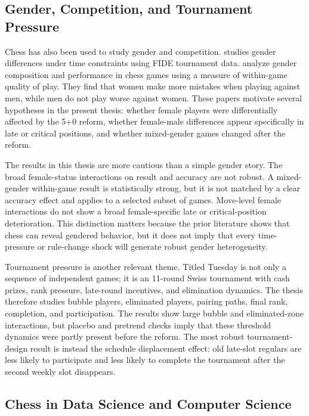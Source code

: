 \subsection{Gender, Competition, and Tournament Pressure}

Chess has also been used to study gender and competition. \citet{dilmaghani2020gender} studies gender differences under time constraints using FIDE tournament data. \citet{backus2023gender} analyze gender composition and performance in chess games using a measure of within-game quality of play. They find that women make more mistakes when playing against men, while men do not play worse against women. These papers motivate several hypotheses in the present thesis: whether female players were differentially affected by the 5+0 reform, whether female-male differences appear specifically in late or critical positions, and whether mixed-gender games changed after the reform.

The results in this thesis are more cautious than a simple gender story. The broad female-status interactions on result and accuracy are not robust. A mixed-gender within-game result is statistically strong, but it is not matched by a clear accuracy effect and applies to a selected subset of games. Move-level female interactions do not show a broad female-specific late or critical-position deterioration. This distinction matters because the prior literature shows that chess can reveal gendered behavior, but it does not imply that every time-pressure or rule-change shock will generate robust gender heterogeneity.

Tournament pressure is another relevant theme. Titled Tuesday is not only a sequence of independent games; it is an 11-round Swiss tournament with cash prizes, rank pressure, late-round incentives, and elimination dynamics. The thesis therefore studies bubble players, eliminated players, pairing paths, final rank, completion, and participation. The results show large bubble and eliminated-zone interactions, but placebo and pretrend checks imply that these threshold dynamics were partly present before the reform. The most robust tournament-design result is instead the schedule displacement effect: old late-slot regulars are less likely to participate and less likely to complete the tournament after the second weekly slot disappears.

\subsection{Chess in Data Science and Computer Science}

